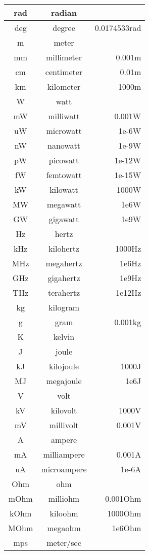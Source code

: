 \begin{longtable}{|c|c|r|}
  rad & radian & \\\hline
  deg & degree & 0.0174533rad \\\hline
  m & meter & \\\hline
  mm & millimeter & 0.001m \\\hline
  cm & centimeter & 0.01m \\\hline
  km & kilometer & 1000m \\\hline
  W & watt & \\\hline
  mW & milliwatt & 0.001W \\\hline
  uW & microwatt & 1e-6W \\\hline
  nW & nanowatt & 1e-9W \\\hline
  pW & picowatt & 1e-12W \\\hline
  fW & femtowatt & 1e-15W \\\hline
  kW & kilowatt & 1000W \\\hline
  MW & megawatt & 1e6W \\\hline
  GW & gigawatt & 1e9W \\\hline
  Hz & hertz & \\\hline
  kHz & kilohertz & 1000Hz \\\hline
  MHz & megahertz & 1e6Hz \\\hline
  GHz & gigahertz & 1e9Hz \\\hline
  THz & terahertz & 1e12Hz \\\hline
  kg & kilogram & \\\hline
  g & gram & 0.001kg \\\hline
  K & kelvin & \\\hline
  J & joule & \\\hline
  kJ & kilojoule & 1000J \\\hline
  MJ & megajoule & 1e6J \\\hline
  V & volt & \\\hline
  kV & kilovolt & 1000V \\\hline
  mV & millivolt & 0.001V \\\hline
  A & ampere & \\\hline
  mA & milliampere & 0.001A \\\hline
  uA & microampere & 1e-6A \\\hline
  Ohm & ohm & \\\hline
  mOhm & milliohm & 0.001Ohm \\\hline
  kOhm & kiloohm & 1000Ohm \\\hline
  MOhm & megaohm & 1e6Ohm \\\hline
  mps & meter/sec & \\\hline

\end{longtable}
